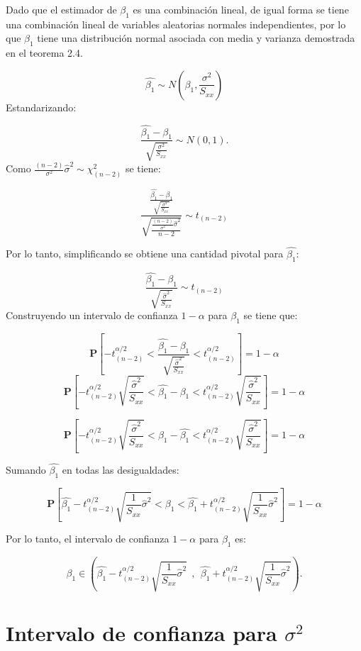 \documentclass[a4paper,oneside,openany]{book}
\begin{document}
Dado que el estimador de \(\beta_{1}\) es una combinación lineal, de
igual forma se tiene una combinación lineal de variables aleatorias
normales independientes, por lo que \(\beta_{1}\) tiene una distribución
normal asociada con media y varianza demostrada en el teorema 2.4.

\[\hat{\beta_{1}}\sim N \left(\beta_{1},\frac{\sigma^2}{S_{xx}}\right)\]
Estandarizando:

\[\frac{\hat{\beta_{1}}-\beta_{1}}{\sqrt{\frac{\sigma^2}{S_{xx}}}}\sim N(0,1).\]
Como \(\frac{(n-2)}{\sigma^2}\hat{\sigma}^2\sim\chi^2_{(n-2)}\) se
tiene:

\[\frac{\frac{\hat{\beta_{1}}-\beta_{1}}{\sqrt{\frac{\sigma^2}{S_{xx}}}}}{\sqrt{\frac{\frac{(n-2)}{\sigma^2}\hat{\sigma}^2}{n-2}}} \sim t_{(n-2)}\]

Por lo tanto, simplificando se obtiene una cantidad pivotal para
\(\hat{\beta_{1}}:\)

\[\frac{\hat{\beta_{1}}-\beta_{1}}{\sqrt{\frac{\hat{\sigma}^2}{S_{xx}}}}\sim t_{(n-2)}\]
Construyendo un intervalo de confianza \(1-\alpha\) para \(\beta_{1}\)
se tiene que:

\[\mathbf{P}\left[-t^{\alpha/2}_{(n-2)} < \frac{\hat{\beta_{1}}-\beta_{1}}{\sqrt{\frac{\hat{\sigma}^2}{S_{xx}}}} < t^{\alpha/2}_{(n-2)}\right]=1-\alpha\]
\[\mathbf{P}\left[-t^{\alpha/2}_{(n-2)} \sqrt{\frac{\hat{\sigma}^2}{S_{xx}}} < \hat{\beta_{1}}-\beta_{1}< t^{\alpha/2}_{(n-2)} \sqrt{\frac{\hat{\sigma}^2}{S_{xx}}}\right]=1-\alpha\]

\[\mathbf{P}\left[-t^{\alpha/2}_{(n-2)} \sqrt{\frac{\hat{\sigma}^2}{S_{xx}}} < \beta_{1}-\hat{\beta_{1}}< t^{\alpha/2}_{(n-2)} \sqrt{\frac{\hat{\sigma}^2}{S_{xx}}}\right]=1-\alpha\]

Sumando \(\hat{\beta_{1}}\) en todas las desigualdades:

\[\mathbf{P}\left[\hat{\beta_{1}}-t^{\alpha/2}_{(n-2)} \sqrt{\frac{1}{S_{xx}}\hat{\sigma}^2} < \beta_{1}< \hat{\beta_{1}}+t^{\alpha/2}_{(n-2)} \sqrt{\frac{1}{S_{xx}}\hat{\sigma}^2}\right]=1-\alpha\]

Por lo tanto, el intervalo de confianza \(1-\alpha\) para \(\beta_{1}\)
es:

\[\beta_{1} \in \left( \hat{\beta_{1}}-t^{\alpha/2}_{(n-2)} \sqrt{\frac{1}{S_{xx}}\hat{\sigma}^2} \ \ , \ \ \hat{\beta_{1}}+t^{\alpha/2}_{(n-2)} \sqrt{\frac{1}{S_{xx}}\hat{\sigma}^2} \right).\]

\section{\texorpdfstring{Intervalo de confianza para
\(\sigma^2\)}{Intervalo de confianza para \textbackslash{}sigma\^{}2}}\label{intervalo-de-confianza-para-sigma2}
\end{document}
